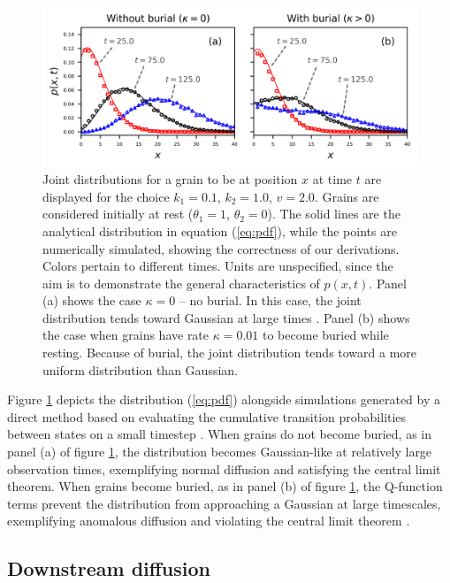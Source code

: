 \begin{figure}[!htbp]
	\includegraphics[width=\linewidth,keepaspectratio]{./figures/ch4/pdf-plot.png}
	\caption{Joint distributions for a grain to be at position $x$ at time $t$ are displayed for the choice $k_1=0.1$, $k_2=1.0$, $v=2.0$. Grains are considered initially at rest ($\theta_1=1$, $\theta_2=0$). The solid lines are the analytical distribution in equation (\ref{eq:pdf}), while the points are numerically simulated, showing the correctness of our derivations. Colors pertain to different times. Units are unspecified, since the aim is to demonstrate the general characteristics of $p(x,t)$. Panel (a) shows the case $\kappa=0$ -- no burial. In this case, the joint distribution tends toward Gaussian at large times \citep{Einstein1937,Lisle1998}. Panel (b) shows the case when grains have rate $\kappa = 0.01$ to become buried while resting. Because of burial, the joint distribution tends toward a more uniform distribution than Gaussian.
		\label{fig:diffpdfs}}
\end{figure}

Figure \ref{fig:diffpdfs} depicts the distribution (\ref{eq:pdf}) alongside simulations generated by a direct method based on evaluating the cumulative transition probabilities between states on a small timestep \citep{Barik2006}.
When grains do not become buried, as in panel (a) of figure \ref{fig:diffpdfs}, the distribution becomes Gaussian-like at relatively large observation times, exemplifying normal diffusion and satisfying the central limit theorem.
When grains become buried, as in panel (b) of figure \ref{fig:diffpdfs},  the Q-function terms prevent the distribution from approaching a Gaussian at large timescales, exemplifying anomalous diffusion \citep{Weeks1998} and violating the central limit theorem \citep{Metzler2000,Schumer2009}.


\subsection{Downstream diffusion}

